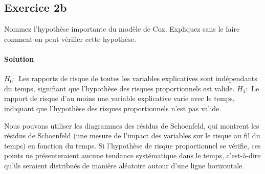 \documentclass[../main.tex]{subfiles}
\begin{document}
\begin{CJK*}{UTF8}{gbsn}
    
\section*{Exercice 2b}
Nommez l'hypothèse importante du modèle de Cox. 
Expliquez sans le faire comment on peut vérifier cette hypothèse.
    
\paragraph{Solution}

$H_0:$ Les rapports de risque de toutes les variables explicatives 
sont indépendants du temps, signifiant que l'hypothèse des risques proportionnels est valide.
$H_1:$ Le rapport de risque d'au moins une variable 
explicative varie avec le temps, indiquant que l'hypothèse des risques proportionnels n'est pas valide.
    
Nous pouvons utiliser les diagrammes des résidus de Schoenfeld, 
qui montrent les résidus de Schoenfeld 
(une mesure de l'impact des variables sur le risque au fil du temps) 
en fonction du temps. Si l'hypothèse de risque proportionnel se vérifie, 
ces points ne présenteraient aucune tendance systématique dans le temps, 
c'est-à-dire qu'ils seraient distribués de manière aléatoire autour d'une ligne horizontale.

\end{CJK*}
\end{document}
